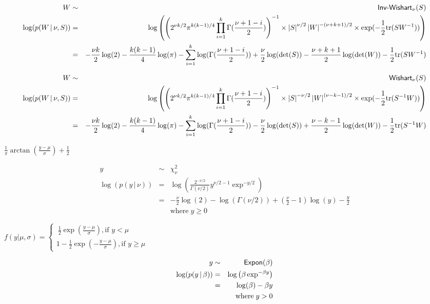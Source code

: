 \documentclass{article}
\begin{document}
\begin{eqnarray*} W &\sim& \mbox{\sf{Inv-Wishart}}_{\nu} (S) \\ \log (p (W \,|\, \nu, S) ) &=& \log \left( \left(2^{\nu k/2} \pi^{k (k-1) /4} \prod_{i=1}^k{\Gamma (\frac{\nu + 1 - i}{2})} \right)^{-1} \times \left| S \right|^{\nu/2} \left| W \right|^{-(\nu + k + 1) / 2} \times \exp (-\frac{1}{2} \mbox{tr} (S W^{-1})) \right) \\ &=& -\frac{\nu k}{2}\log(2) - \frac{k (k-1)}{4} \log(\pi) - \sum_{i=1}^{k}{\log (\Gamma (\frac{\nu+1-i}{2}))} +\frac{\nu}{2} \log(\det(S)) - \frac{\nu+k+1}{2}\log (\det(W)) - \frac{1}{2} \mbox{tr}(S W^{-1}) \end{eqnarray*}
\pagebreak

\begin{eqnarray*} W &\sim& \mbox{\sf{Wishart}}_{\nu} (S) \\ \log (p (W \,|\, \nu, S) ) &=& \log \left( \left(2^{\nu k/2} \pi^{k (k-1) /4} \prod_{i=1}^k{\Gamma (\frac{\nu + 1 - i}{2})} \right)^{-1} \times \left| S \right|^{-\nu/2} \left| W \right|^{(\nu - k - 1) / 2} \times \exp (-\frac{1}{2} \mbox{tr} (S^{-1} W)) \right) \\ &=& -\frac{\nu k}{2}\log(2) - \frac{k (k-1)}{4} \log(\pi) - \sum_{i=1}^{k}{\log (\Gamma (\frac{\nu+1-i}{2}))} -\frac{\nu}{2} \log(\det(S)) + \frac{\nu-k-1}{2}\log (\det(W)) - \frac{1}{2} \mbox{tr} (S^{-1}W) \end{eqnarray*}
\pagebreak

$\frac{1}{\pi}\arctan\left(\frac{y-\mu}{\sigma}\right) + \frac{1}{2}$
\pagebreak

\begin{eqnarray*} y &\sim& \chi^2_\nu \\ \log (p (y \,|\, \nu)) &=& \log \left( \frac{2^{-\nu / 2}}{\Gamma (\nu / 2)} y^{\nu / 2 - 1} \exp^{- y / 2} \right) \\ &=& - \frac{\nu}{2} \log(2) - \log (\Gamma (\nu / 2)) + (\frac{\nu}{2} - 1) \log(y) - \frac{y}{2} \\ & & \mathrm{ where } \; y \ge 0 \end{eqnarray*}
\pagebreak

$ f(y|\mu,\sigma) = \begin{cases} \ \frac{1}{2} \exp\left(\frac{y-\mu}{\sigma}\right), \mbox{if } y < \mu \\ 1 - \frac{1}{2} \exp\left(-\frac{y-\mu}{\sigma}\right), \mbox{if } y \ge \mu \ \end{cases}$
\pagebreak

\begin{eqnarray*} y &\sim& \mbox{\sf{Expon}}(\beta) \\ \log (p (y \,|\, \beta) ) &=& \log \left( \beta \exp^{-\beta y} \right) \\ &=& \log (\beta) - \beta y \\ & & \mathrm{where} \; y > 0 \end{eqnarray*}
\pagebreak
\end{document}
